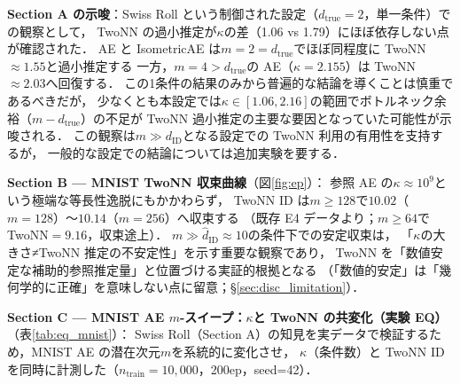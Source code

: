 \documentclass[11pt,a4paper]{jsarticle}
\newcommand{\kap}{\kappa}
\begin{document}
\textbf{Section A の示唆}：Swiss Roll という制御された設定（$d_\mathrm{true}=2$，単一条件）での観察として，
TwoNN の過小推定が$\kap$の差（1.06 vs 1.79）にほぼ依存しない点が確認された．
AE と IsometricAE は$m=2=d_\mathrm{true}$でほぼ同程度に TwoNN$\approx1.55$と過小推定する
一方，$m=4>d_\mathrm{true}$の AE（$\kap=2.155$）は TwoNN$\approx2.03$へ回復する．
この1条件の結果のみから普遍的な結論を導くことは慎重であるべきだが，
少なくとも本設定では$\kap \in [1.06, 2.16]$の範囲でボトルネック余裕（$m - d_\mathrm{true}$）の不足が
TwoNN 過小推定の主要な要因となっていた可能性が示唆される．
この観察は$m \gg d_\mathrm{ID}$となる設定での TwoNN 利用の有用性を支持するが，
一般的な設定での結論については追加実験を要する．

\textbf{Section B — MNIST TwoNN 収束曲線}（図\ref{fig:ep}）：
参照 AE の$\kap \approx 10^9$という極端な等長性逸脱にもかかわらず，
TwoNN ID は$m \geq 128$で$10.02$（$m=128$）〜$10.14$（$m=256$）へ収束する
（既存 E4 データより；$m \geq 64$で TwoNN$=9.16$，収束途上）．
$m \gg \hat{d}_\mathrm{ID} \approx 10$の条件下での安定収束は，
「$\kap$の大きさ≠TwoNN 推定の不安定性」を示す重要な観察であり，
TwoNN を「数値安定な補助的参照推定量」と位置づける実証的根拠となる
（「数値的安定」は「幾何学的に正確」を意味しない点に留意；§\ref{sec:disc_limitation}）．

\textbf{Section C — MNIST AE $m$-スイープ：$\kappa$と TwoNN の共変化（実験 EQ）}（表\ref{tab:eq_mnist}）：
Swiss Roll（Section A）の知見を実データで検証するため，MNIST AE の潜在次元$m$を系統的に変化させ，
$\kap$（条件数）と TwoNN ID を同時に計測した（$n_\mathrm{train}=10{,}000$，200ep，seed=42）．
\end{document}
